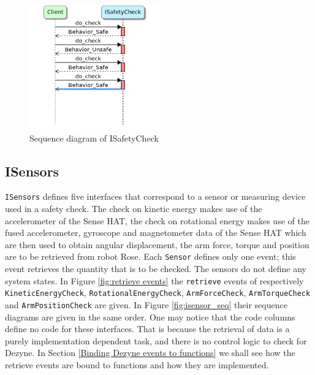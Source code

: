 \documentclass[12pt]{scrreprt}
\begin{document}
\begin{figure}[H]
    \centering
    \includegraphics[width=0.5\textwidth]{Figures/results/modelling_figures/ISafetyCheck/ISafetyCheck_seq.png}
    \caption{Sequence diagram of ISafetyCheck}
    \label{fig:Sequence diagram of ISafetyCheck.}
\end{figure}

\subsection{ISensors}
\texttt{ISensors} defines five interfaces that correspond to a sensor or measuring device used in a safety check. The check on kinetic energy makes use of the accelerometer of the Sense HAT, the check on rotational energy makes use of the fused accelerometer, gyroscope and magnetometer data of the Sense HAT which are then used to obtain angular displacement, the arm force, torque and position are to be retrieved from robot Rose. Each \texttt{Sensor} defines only one event; this event retrieves the quantity that is to be checked. The sensors do not define any system states. In Figure \ref{fig:retrieve events} the \texttt{retrieve} events of respectively \texttt{KineticEnergyCheck}, \texttt{RotationalEnergyCheck}, \texttt{ArmForceCheck}, \texttt{ArmTorqueCheck} and \texttt{ArmPositionCheck} are given. In Figure \ref{fig:isensor_seq} their sequence diagrams are given in the same order. One may notice that the code columns define no code for these interfaces. That is because the retrieval of data is a purely implementation dependent task, and there is no control logic to check for Dezyne. In Section \ref{Binding Dezyne events to functions} we shall see how the retrieve events are bound to functions and how they are implemented.
\end{document}
